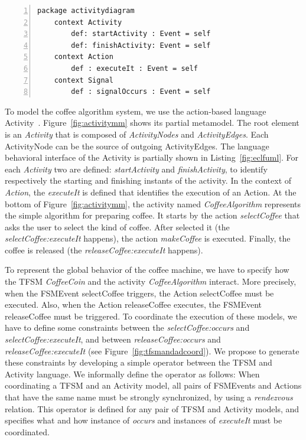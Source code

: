 	\begin{lstlisting}[language=ecl,
	caption={Partial \ecl specification of Activity Diagram},
	label={fig:eclfuml}, 
	basicstyle=\scriptsize\ttfamily, backgroundcolor=\color{LGrey}, numbers=left, xleftmargin=3pt, belowskip=-0.4em]
	package activitydiagram
	context Activity
		def: startActivity : Event = self
		def: finishActivity: Event = self
	context Action
		def : executeIt : Event = self
	context Signal
		def : signalOccurs : Event = self
	\end{lstlisting}
To model the coffee algorithm system, we use the action-based language Activity~\cite{ttc15bib}. Figure~\ref{fig:activitymm} shows its partial metamodel. The root element is an \emph{Activity} that is composed of \emph{ActivityNodes} and \emph{ActivityEdges}. Each ActivityNode can be the source of outgoing ActivityEdges. The language behavioral interface of the Activity is partially shown in Listing~\ref{fig:eclfuml}. For each \emph{Activity} two \dse are defined: \emph{startActivity} and \emph{finishActivity}, to identify respectively the starting and finishing instants of the activity. In the context of \emph{Action}, the \dse \emph{executeIt} is defined that identifies the execution of an Action. At the bottom of Figure~\ref{fig:activitymm}, the activity named \emph{CoffeeAlgorithm} represents the simple algorithm for preparing coffee. It starts by the action \emph{selectCoffee} that asks the user to select the kind of coffee. After selected it (the \mse \emph{selectCoffee:executeIt} happens), the action \emph{makeCoffee} is executed. Finally, the coffee is released (the \mse \emph{releaseCoffee:executeIt} happens).

To represent the global behavior of the coffee machine, we have to specify how the TFSM \emph{CoffeeCoin} and the activity \emph{CoffeeAlgorithm} interact. More precisely, when the FSMEvent selectCoffee triggers, the Action selectCoffee must be executed. Also, when the Action releaseCoffee executes, the FSMEvent releaseCoffee must be triggered. To coordinate the execution of these models, we have to define some constraints between the \mse \emph{selectCoffee:occurs} and \emph{selectCoffee:executeIt}, and between \emph{releaseCoffee:occurs} and \emph{releaseCoffee:executeIt} (see Figure~\ref{fig:tfsmandadcoord}). We propose to generate these constraints by developing a simple \bcool operator between the TFSM and Activity language. We informally define the operator as follows: When coordinating a TFSM and an Activity model, all pairs of FSMEvents and Actions that have the same name must be strongly synchronized, \ie by using a \emph{rendezvous} relation. This operator is defined for any pair of TFSM and Activity models, and specifies what and how instance of \dse \emph{occurs} and instances of \dse \emph{executeIt} must be coordinated. 

